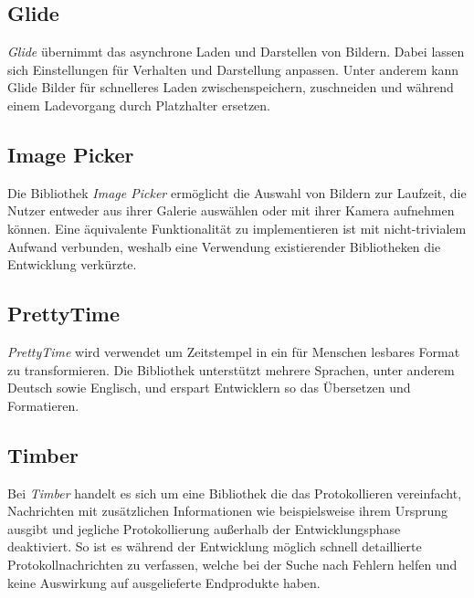 \subsection{Glide}
\label{subsec:app:bibs:glide}
\textit{Glide} übernimmt das asynchrone Laden und Darstellen von Bildern.
Dabei lassen sich Einstellungen für Verhalten und Darstellung anpassen.
Unter anderem kann Glide Bilder für schnelleres Laden zwischenspeichern, zuschneiden und während einem Ladevorgang durch Platzhalter ersetzen.

\subsection{Image Picker}
\label{subsec:app:bibs:imagepicker}
Die Bibliothek \textit{Image Picker} ermöglicht die Auswahl von Bildern zur Laufzeit, die Nutzer entweder aus ihrer Galerie auswählen oder mit ihrer Kamera aufnehmen können.
Eine äquivalente Funktionalität zu implementieren ist mit nicht-trivialem Aufwand verbunden, weshalb eine Verwendung existierender Bibliotheken die Entwicklung verkürzte.

\subsection{PrettyTime}
\label{subsec:app:bibs:prettytime}
\textit{PrettyTime} wird verwendet um Zeitstempel in ein für Menschen lesbares Format zu transformieren.
Die Bibliothek unterstützt mehrere Sprachen, unter anderem Deutsch sowie Englisch, und erspart Entwicklern so das Übersetzen und Formatieren.

\subsection{Timber}
\label{subsec:app:bibs:timber}
Bei \textit{Timber} handelt es sich um eine Bibliothek die das Protokollieren vereinfacht, Nachrichten mit zusätzlichen Informationen wie beispielsweise ihrem Ursprung ausgibt und jegliche Protokollierung außerhalb der Entwicklungsphase deaktiviert.
So ist es während der Entwicklung möglich schnell detaillierte Protokollnachrichten zu verfassen, welche bei der Suche nach Fehlern helfen und keine Auswirkung auf ausgelieferte Endprodukte haben.

